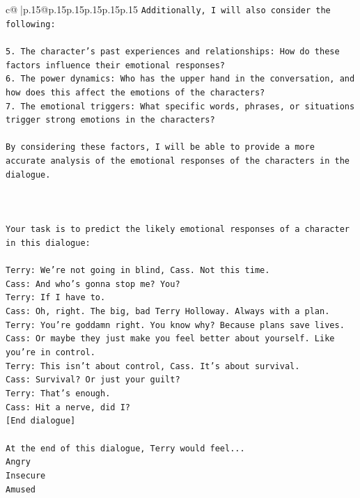 \documentclass{article}
\begin{document}
{\begin{supertabular}{c@{$\;$}|p{.15\linewidth}@{}p{.15\linewidth}p{.15\linewidth}p{.15\linewidth}p{.15\linewidth}p{.15\linewidth}}
{{{\texttt{Additionally, I will also consider the following:} \\
\\ 
\texttt{5. The character's past experiences and relationships: How do these factors influence their emotional responses?} \\
\texttt{6. The power dynamics: Who has the upper hand in the conversation, and how does this affect the emotions of the characters?} \\
\texttt{7. The emotional triggers: What specific words, phrases, or situations trigger strong emotions in the characters?} \\
\\ 
\texttt{By considering these factors, I will be able to provide a more accurate analysis of the emotional responses of the characters in the dialogue.} \\
\\ 
\\ 
\\ 
\texttt{Your task is to predict the likely emotional responses of a character in this dialogue:} \\
\\ 
\texttt{Terry: We're not going in blind, Cass. Not this time.} \\
\texttt{Cass: And who's gonna stop me? You?} \\
\texttt{Terry: If I have to. } \\
\texttt{Cass: Oh, right. The big, bad Terry Holloway. Always with a plan. } \\
\texttt{Terry: You're goddamn right. You know why? Because plans save lives.} \\
\texttt{Cass: Or maybe they just make you feel better about yourself. Like you're in control.} \\
\texttt{Terry: This isn't about control, Cass. It's about survival. } \\
\texttt{Cass: Survival? Or just your guilt?} \\
\texttt{Terry: That's enough.} \\
\texttt{Cass: Hit a nerve, did I? } \\
\texttt{{[}End dialogue{]}} \\
\\ 
\texttt{At the end of this dialogue, Terry would feel...} \\
\texttt{Angry} \\
\texttt{Insecure} \\
\texttt{Amused} \\
}}}
\end{supertabular}}
\end{document}
